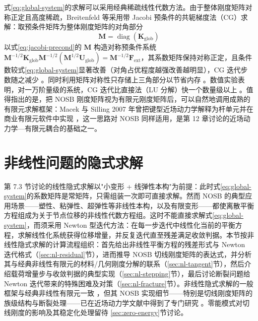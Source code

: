 式\eqref{eq:global-system}的求解可以采用经典稀疏线性代数方法。由于整体刚度矩阵对称正定且高度稀疏，Breitenfeld 等采用带 Jacobi 预条件的共轭梯度法（CG）求解：取预条件矩阵为整体刚度矩阵的对角部分
\begin{equation}
  \mathbf{M}=\operatorname{diag}(\mathbf{K}_{\mathrm{glob}})
  \label{eq:jacobi-precond}
\end{equation}
以式\eqref{eq:jacobi-precond}的 $\mathbf{M}$ 构造对称预条件系统 $\mathbf{M}^{-1/2}\mathbf{K}_{\mathrm{glob}}\mathbf{M}^{-1/2}(\mathbf{M}^{1/2}\mathbf{U}_{\mathrm{glob}})=\mathbf{M}^{-1/2}\mathbf{F}_{\mathrm{ext}}$，其系数矩阵保持对称正定，且条件数较式\eqref{eq:global-system}显著改善（对角占优程度越强改善越明显），CG 迭代步数随之减少 \cite{Breitenfeld2014}。同时利用矩阵对称性只存储上三角部分以节省内存 \cite{Breitenfeld2014}。数值实验表明，对一万阶量级的系统，CG 迭代比直接法（LU 分解）快一个数量级以上 \cite{Breitenfeld2014,BreitenfeldThesis2014}。值得指出的是，把 NOSB 刚度矩阵视为有限元刚度矩阵后，可以自然地调用成熟的有限元求解框架：Macek 与 Silling 2007 年曾把键型近场动力学解释为杆单元并在商业有限元软件中实现 \cite{Macek2007}，这一思路对 NOSB 同样适用，是第 12 章讨论的近场动力学—有限元耦合的基础之一。

\section{非线性问题的隐式求解}\label{sec:implicit-nonlinear}

第 7.3 节讨论的线性隐式求解以"小变形 + 线弹性本构"为前提：此时式\eqref{eq:global-system}的系数矩阵是常矩阵，只需组装一次即可直接求解。然而 NOSB 的典型应用场景——塑性、粘弹性、超弹性等非线性本构，以及有限变形——都使离散平衡方程组成为关于节点位移的非线性代数方程组。这时不能直接求解式\eqref{eq:global-system}，而须采用 Newton 型迭代方法：在每一步迭代中线性化当前的平衡方程，求解线性化系统获得位移增量，并反复迭代直至残差满足收敛判据。本节按非线性隐式求解的计算流程组织：首先给出非线性平衡方程的残差形式与 Newton 迭代格式（\ref{sec:nl-residual}节），进而推导 NOSB 切线刚度矩阵的表达式，并分析其与经典非线性有限元的材料/几何刚度分解的联系（\ref{sec:nl-tangent}节），然后介绍载荷增量步与收敛判据的典型实现（\ref{sec:nl-stepping}节），最后讨论断裂问题给 Newton 迭代带来的特殊困难及对策（\ref{sec:nl-fracture}节）。非线性隐式求解的一般框架与经典非线性有限元一致 \cite{BelytschkoLiuMoran2000}，但其 NOSB 实现细节——特别是切线刚度矩阵的族级结构与断裂处理——已在近场动力学文献中得到了专门研究 \cite{Hashim2020,Littlewood2015,Ni2019}。零能模式对切线刚度的影响及其稳定化处理留待 \ref{sec:zero-energy}节讨论。

